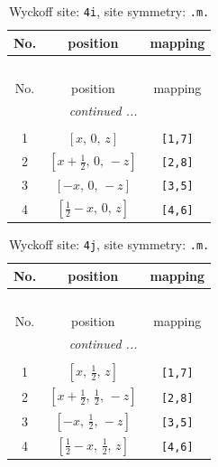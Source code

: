 \documentclass[fleqn,8pt]{jsarticle}
\begin{document}
\renewcommand{\arraystretch}{1.2}
\begin{longtable}{ccc}
\caption{Wyckoff site: {\tt 4i}, site symmetry: {\tt .m.}}
 \\
 \hline \hline
No. & position & mapping \\ \hline \endfirsthead

\multicolumn{2}{l}{\tablename\ \thetable{}} \\
 \hline \hline
No. & position & mapping \\ \hline \endhead

 \hline \hline
\multicolumn{2}{r}{\footnotesize\it continued ...} \\ \endfoot

 \hline \hline
\multicolumn{2}{r}{} \\ \endlastfoot

1 & $\left[ x,\, 0,\, z \right]$ & {\tt [1,7]} \\ \hline
2 & $\left[ x + \frac{1}{2},\, 0,\, - z \right]$ & {\tt [2,8]} \\ \hline
3 & $\left[ - x,\, 0,\, - z \right]$ & {\tt [3,5]} \\ \hline
4 & $\left[ \frac{1}{2} - x,\, 0,\, z \right]$ & {\tt [4,6]} \\
\end{longtable}
\renewcommand{\arraystretch}{1.2}
\begin{longtable}{ccc}
\caption{Wyckoff site: {\tt 4j}, site symmetry: {\tt .m.}}
 \\
 \hline \hline
No. & position & mapping \\ \hline \endfirsthead

\multicolumn{2}{l}{\tablename\ \thetable{}} \\
 \hline \hline
No. & position & mapping \\ \hline \endhead

 \hline \hline
\multicolumn{2}{r}{\footnotesize\it continued ...} \\ \endfoot

 \hline \hline
\multicolumn{2}{r}{} \\ \endlastfoot

1 & $\left[ x,\, \frac{1}{2},\, z \right]$ & {\tt [1,7]} \\ \hline
2 & $\left[ x + \frac{1}{2},\, \frac{1}{2},\, - z \right]$ & {\tt [2,8]} \\ \hline
3 & $\left[ - x,\, \frac{1}{2},\, - z \right]$ & {\tt [3,5]} \\ \hline
4 & $\left[ \frac{1}{2} - x,\, \frac{1}{2},\, z \right]$ & {\tt [4,6]} \\
\end{longtable}
\end{document}
